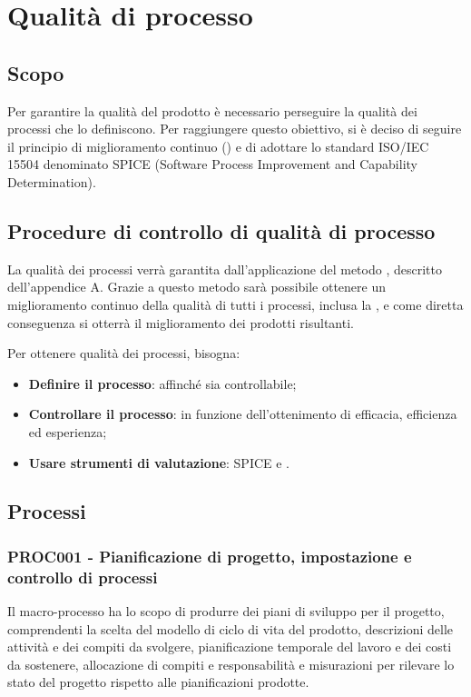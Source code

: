 \documentclass[PianoDiQualifica.tex]{subfiles}
\begin{document}
\chapter{Qualità di processo}

\section{Scopo} 
Per garantire la qualità del prodotto è necessario perseguire la qualità dei processi che lo definiscono.
Per raggiungere questo obiettivo, si è deciso di seguire il principio di miglioramento continuo () e di adottare lo standard ISO/IEC 15504 denominato SPICE (Software Process Improvement and Capability Determination).

\section{Procedure di controllo di qualità di processo}
La qualità dei processi verrà garantita dall'applicazione del metodo , descritto dell'appendice A. Grazie a questo metodo sarà possibile ottenere un miglioramento continuo della qualità di tutti i processi, inclusa la , e come diretta conseguenza si otterrà il miglioramento dei prodotti risultanti. 

Per ottenere qualità dei processi, bisogna:
\begin{itemize}
	\item \textbf{Definire il processo}: affinché sia controllabile;
	\item \textbf{Controllare il processo}: in funzione dell'ottenimento di efficacia, efficienza ed esperienza;
	\item \textbf{Usare strumenti di valutazione}: SPICE e .
\end{itemize}

\section{Processi}

\subsection{PROC001 - Pianificazione di progetto, impostazione e controllo di processi}
Il macro-processo ha lo scopo di produrre dei piani di sviluppo per il progetto, comprendenti la scelta del modello di ciclo di vita del prodotto, descrizioni delle attività e dei compiti da svolgere, pianificazione temporale del lavoro e dei costi da sostenere, allocazione di compiti e responsabilità e misurazioni per rilevare lo stato del progetto rispetto alle pianificazioni prodotte.
\end{document}
